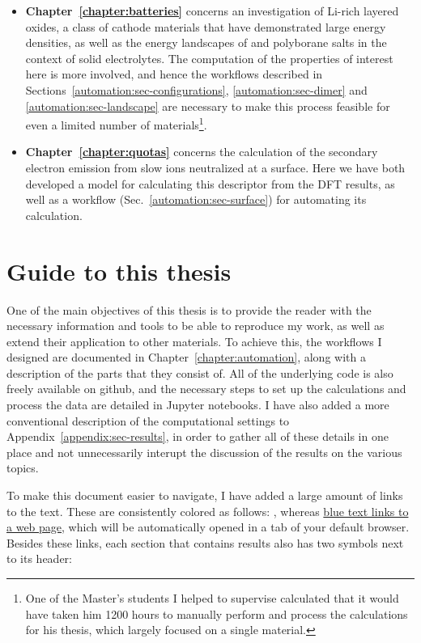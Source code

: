 \begin{refsection}
\begin{itemize}[]
\item \textbf{Chapter~\ref{chapter:batteries}} concerns an investigation of Li-rich layered oxides, a class of cathode materials that have demonstrated large energy densities, as well as the energy landscapes of  and  polyborane salts in the context of solid electrolytes. The computation of the properties of interest here is more involved, and hence the workflows described in Sections~\ref{automation:sec-configurations}, \ref{automation:sec-dimer} and \ref{automation:sec-landscape} are necessary to make this process feasible for even a limited number of materials\footnote{One of the Master's students I helped to supervise calculated that it would have taken him 1200 hours to manually perform and process the calculations for his thesis, which largely focused on a single material.}.

\item \textbf{Chapter~\ref{chapter:quotas}} concerns the calculation of the secondary electron emission from slow ions neutralized at a surface. Here we have both developed a model for calculating this descriptor from the DFT results, as well as a workflow (Sec.~\ref{automation:sec-surface}) for automating its calculation.

\end{itemize}

\section{Guide to this thesis} \label{intro:sec-guide}

One of the main objectives of this thesis is to provide the reader with the necessary information and tools to be able to reproduce my work, as well as extend their application to other materials. To achieve this, the workflows I designed are documented in Chapter~\ref{chapter:automation}, along with a description of the parts that they consist of. All of the underlying code is also freely available on github, and the necessary steps to set up the calculations and process the data are detailed in Jupyter notebooks. I have also added a more conventional description of the computational settings to Appendix~\ref{appendix:sec-results}, in order to gather all of these details in one place and not unnecessarily interupt the discussion of the results on the various topics.

To make this document easier to navigate, I have added a large amount of links to the text. These are consistently colored as follows: , whereas \href{https://github.com/mbercx/phd-thesis}{blue text links to a web page}, which will be automatically opened in a tab of your default browser. Besides these links, each section that contains results also has two symbols next to its header:


\end{refsection}
